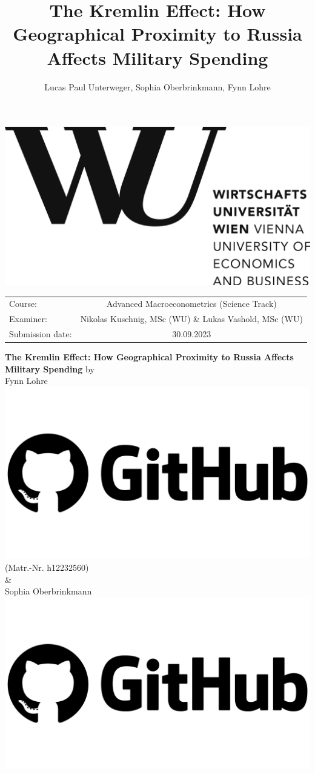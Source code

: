 \documentclass[12pt,a4paper]{article}
\author{Lucas Paul Unterweger, Sophia Oberbrinkmann, Fynn Lohre}
\title{The Kremlin Effect: How Geographical Proximity to Russia Affects Military Spending}
\begin{document}
\begin{titlepage}
\center
\vfill
\includegraphics[scale=0.08]{WU.png}
\vfill
\begin{tabular}[t]{lc}
Course:  & Advanced Macroeconometrics (Science Track) \\
Examiner: & 
Nikolas Kuschnig, MSc (WU) \& Lukas Vashold, MSc (WU) \\
Submission date: & 30.09.2023 \\
\end{tabular}
\vfill
{\large \textbf{The Kremlin Effect: How Geographical Proximity to Russia Affects Military Spending}}
\vfill
by\\ \vspace{3mm}
{\Large Fynn Lohre \href{https://github.com/VARFynn}{\includegraphics[scale=0.01]{GitHub.png}}}\\
(Matr.-Nr. h12232560)\\ \vspace{3mm}
\& \\ \vspace{3mm}
{\Large Sophia Oberbrinkmann \href{https://github.com/SophiaOberbrinkmann}{\includegraphics[scale=0.01]{GitHub.png}}}\\

\end{titlepage}
\end{document}

